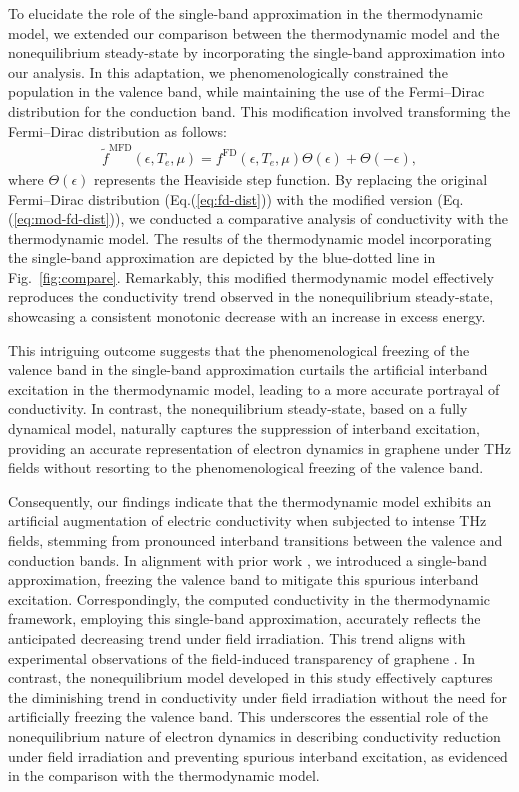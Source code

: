 To elucidate the role of the single-band approximation in the thermodynamic model, we extended our comparison between the thermodynamic model and the nonequilibrium steady-state by incorporating the single-band approximation into our analysis. In this adaptation, we phenomenologically constrained the population in the valence band, while maintaining the use of the Fermi--Dirac distribution for the conduction band. This modification involved transforming the Fermi--Dirac distribution as follows:
\begin{align}
\tilde f^{\mathrm{MFD}}(\epsilon, T_e, \mu)=f^{\mathrm{FD}}(\epsilon, T_e, \mu)\Theta(\epsilon)+\Theta(-\epsilon),
\label{eq:mod-fd-dist}
\end{align}
where $\Theta(\epsilon)$ represents the Heaviside step function. By replacing the original Fermi--Dirac distribution (Eq.(\ref{eq:fd-dist})) with the modified version (Eq.(\ref{eq:mod-fd-dist})), we conducted a comparative analysis of conductivity with the thermodynamic model. The results of the thermodynamic model incorporating the single-band approximation are depicted by the blue-dotted line in Fig.~\ref{fig:compare}. Remarkably, this modified thermodynamic model effectively reproduces the conductivity trend observed in the nonequilibrium steady-state, showcasing a consistent monotonic decrease with an increase in excess energy.

This intriguing outcome suggests that the phenomenological freezing of the valence band in the single-band approximation curtails the artificial interband excitation in the thermodynamic model, leading to a more accurate portrayal of conductivity. In contrast, the nonequilibrium steady-state, based on a fully dynamical model, naturally captures the suppression of interband excitation, providing an accurate representation of electron dynamics in graphene under THz fields without resorting to the phenomenological freezing of the valence band.

Consequently, our findings indicate that the thermodynamic model exhibits an artificial augmentation of electric conductivity when subjected to intense THz fields, stemming from pronounced interband transitions between the valence and conduction bands. In alignment with prior work \cite{kovalev2021electrical}, we introduced a single-band approximation, freezing the valence band to mitigate this spurious interband excitation. Correspondingly, the computed conductivity in the thermodynamic framework, employing this single-band approximation, accurately reflects the anticipated decreasing trend under field irradiation. This trend aligns with experimental observations of the field-induced transparency of graphene \cite{Hwang2013, Paul_2013, doi:10.1063/1.4902999}. In contrast, the nonequilibrium model developed in this study effectively captures the diminishing trend in conductivity under field irradiation without the need for artificially freezing the valence band. This underscores the essential role of the nonequilibrium nature of electron dynamics in describing conductivity reduction under field irradiation and preventing spurious interband excitation, as evidenced in the comparison with the thermodynamic model.
